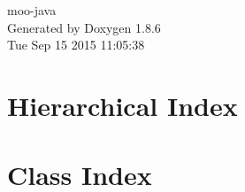 \documentclass[twoside]{book}
\newcommand{\clearemptydoublepage}{%
  \newpage{\pagestyle{empty}\cleardoublepage}%
}
\begin{document}
\hypersetup{pageanchor=false}
\begin{titlepage}
\vspace*{7cm}
\begin{center}%
{\Large moo-\/java }\\
\vspace*{1cm}
{\large Generated by Doxygen 1.8.6}\\
\vspace*{0.5cm}
{\small Tue Sep 15 2015 11:05:38}\\
\end{center}
\end{titlepage}
\clearemptydoublepage
\tableofcontents
\clearemptydoublepage
{}
\hypersetup{pageanchor=true}

\chapter{Hierarchical Index}

\chapter{Class Index}

\end{document}

